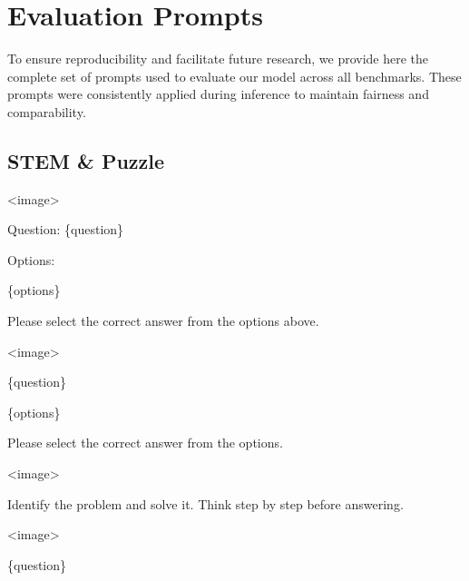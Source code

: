 \section{Evaluation Prompts}
\label{sec:eval_prompts}


To ensure reproducibility and facilitate future research, we provide here the complete set of prompts used to evaluate our model across all benchmarks. These prompts were consistently applied during inference to maintain fairness and comparability.

\subsection{STEM \& Puzzle}
\label{sec:stem}

\begin{tcolorbox}[
  title=MMMU,
  fonttitle=\bfseries,
  colframe=black,
  colback=white,
  toptitle=1mm,
  bottomtitle=1mm,
  top=2mm,
  verbatim,
]
<image>

Question: \{question\}

Options:

\{options\}

Please select the correct answer from the options above.
\end{tcolorbox}

\begin{tcolorbox}[
  title=MMMUPro\_Standard,
  fonttitle=\bfseries,
  colframe=black,
  colback=white,
  toptitle=1mm,
  bottomtitle=1mm,
  top=2mm,
  verbatim,
]
<image>

\{question\}

\{options\}

Please select the correct answer from the options.
\end{tcolorbox}

\begin{tcolorbox}[
  title=MMMUPro\_Vision,
  fonttitle=\bfseries,
  colframe=black,
  colback=white,
  toptitle=1mm,
  bottomtitle=1mm,
  top=2mm,
  verbatim,
]
<image>

Identify the problem and solve it. Think step by step before answering.
\end{tcolorbox}

\begin{tcolorbox}[
  title=MathVista,
  title={MathVista | MathVision | MathVerse | LogicVista},
  fonttitle=\bfseries,
  colframe=black,
  colback=white,
  toptitle=1mm,
  bottomtitle=1mm,
  top=2mm,
  verbatim,
]
<image>

\{question\}
\end{tcolorbox}

